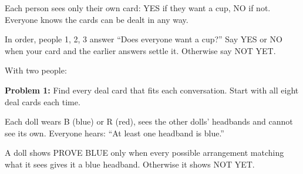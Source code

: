 \documentclass[12pt,letterpaper]{article}
\newcommand\problem[2]{\textbf{Problem #1:} #2\par}
\newcommand\transcript[6]{%
 \draw[rounded corners=3pt] (#1,#2) rectangle ++(8.05,-2.9);
 \node[anchor=west,font=\bfseries\small] at (#1+0.3,#2-0.38) {Conversation #3};
 \foreach \i/\reply in {1/#4,2/#5,3/#6}{\node[anchor=west,font=\small] at (#1+0.4,#2-0.38-0.7*\i) {\i\quad \reply};}}
\begin{document}
\fontsize{13}{16}\selectfont
\raggedright

Each person sees only their own card: YES if they want a cup, NO if not. Everyone knows the cards can be dealt in any way.

In order, people 1, 2, 3 answer ``Does everyone want a cup?'' Say YES or NO when your card and the earlier answers settle it. Otherwise say NOT YET.

With two people:

\begin{center}
\end{center}

\problem{1}{Find every deal card that fits each conversation. Start with all eight deal cards each time.}

\begin{center}
\end{center}

\newpage

Each doll wears B (blue) or R (red), sees the other dolls' headbands and cannot see its own. Everyone hears: ``At least one headband is blue.''

A doll shows PROVE BLUE only when every possible arrangement matching what it sees gives it a blue headband. Otherwise it shows NOT YET.
\end{document}
